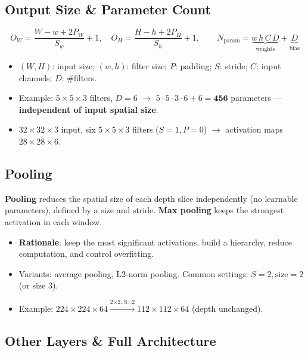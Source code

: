 \documentclass[10pt,a4paper]{article}
\begin{document}
	\subsection{Output Size \& Parameter Count}

	\begin{formulabox}
		\[
		O_W = \frac{W - w + 2P_W}{S_w} + 1, \quad
		O_H = \frac{H - h + 2P_H}{S_h} + 1, \qquad
		N_{\text{param}} = \underbrace{w\,h\,C\,D}_{\text{weights}} + \underbrace{D}_{\text{bias}}
		\]
	\end{formulabox}
	\begin{itemize}[leftmargin=*]
		\item $(W,H)$: input size; $(w,h)$: filter size; $P$: padding; $S$: stride; $C$: input channels; $D$: \#filters.
		\item Example: $5{\times}5{\times}3$ filters, $D{=}6$ $\rightarrow$ $5\cdot5\cdot3\cdot6 + 6 = \mathbf{456}$ parameters --- \textbf{independent of input spatial size}.
		\item $32{\times}32{\times}3$ input, six $5{\times}5{\times}3$ filters ($S{=}1,P{=}0$) $\rightarrow$ activation maps $28{\times}28{\times}6$.
	\end{itemize}

	\subsection{Pooling}

	\begin{definitionbox}
		\textbf{Pooling} reduces the spatial size of each depth slice independently (no learnable parameters), defined by a size and stride. \textbf{Max pooling} keeps the strongest activation in each window.
	\end{definitionbox}
	\begin{itemize}[leftmargin=*]
		\item \textbf{Rationale}: keep the most significant activations, build a hierarchy, reduce computation, and control overfitting.
		\item Variants: average pooling, L2-norm pooling. Common settings: $S{=}2,\text{size}{=}2$ (or size 3).
		\item Example: $224{\times}224{\times}64 \xrightarrow{\text{2×2, S=2}} 112{\times}112{\times}64$ (depth unchanged).
	\end{itemize}

	\subsection{Other Layers \& Full Architecture}
\end{document}
